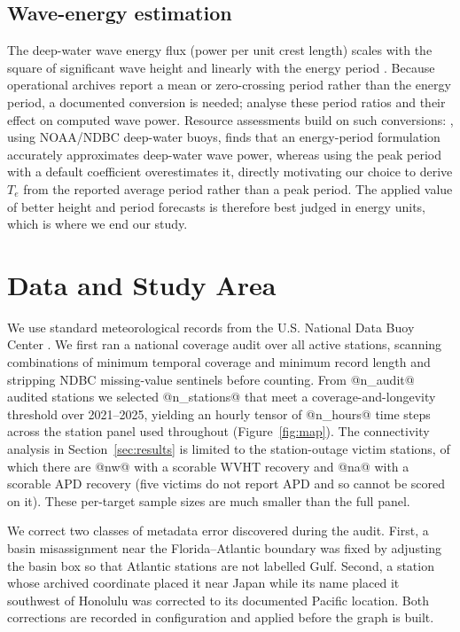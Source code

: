 \documentclass[11pt]{article}
\begin{document}
\subsection{Wave-energy estimation}
The deep-water wave energy flux (power per unit crest length) scales with the
square of significant wave height and linearly with the energy period
\citep{cahill2014}. Because operational archives report a mean or zero-crossing
period rather than the energy period, a documented conversion is needed;
\citet{cahill2014} analyse these period ratios and their effect on computed wave
power. Resource assessments build on such conversions:
\citet{guillou2020}, using NOAA/NDBC deep-water buoys, finds that an energy-period
formulation accurately approximates deep-water wave power, whereas using the peak
period with a default coefficient overestimates it, directly motivating our
choice to derive $T_e$ from the reported average period rather than a peak period.
The applied value of better height and period forecasts is therefore best judged
in energy units, which is where we end our study.

\section{Data and Study Area}
\label{sec:data}
We use standard meteorological records from the U.S. National Data Buoy Center
\citep{ndbc}. We first ran a national coverage audit over all active stations,
scanning combinations of minimum temporal coverage and minimum record length and
stripping NDBC missing-value sentinels before counting. From @n_audit@ audited
stations we selected @n_stations@ that meet a coverage-and-longevity threshold
over 2021--2025, yielding an hourly tensor of @n_hours@ time steps across the
station panel used throughout (Figure~\ref{fig:map}). The connectivity analysis
in Section~\ref{sec:results}
is limited to the station-outage victim stations, of which there are @nw@ with a
scorable WVHT recovery and @na@ with a scorable APD recovery (five victims do not
report APD and so cannot be scored on it). These per-target sample sizes are much
smaller than the full panel.

We correct two classes of metadata error discovered during the audit. First, a
basin misassignment near the Florida--Atlantic boundary was fixed by adjusting
the basin box so that Atlantic stations are not labelled Gulf. Second, a station
whose archived coordinate placed it near Japan while its name placed it southwest
of Honolulu was corrected to its documented Pacific location. Both corrections
are recorded in configuration and applied before the graph is built.
\end{document}
